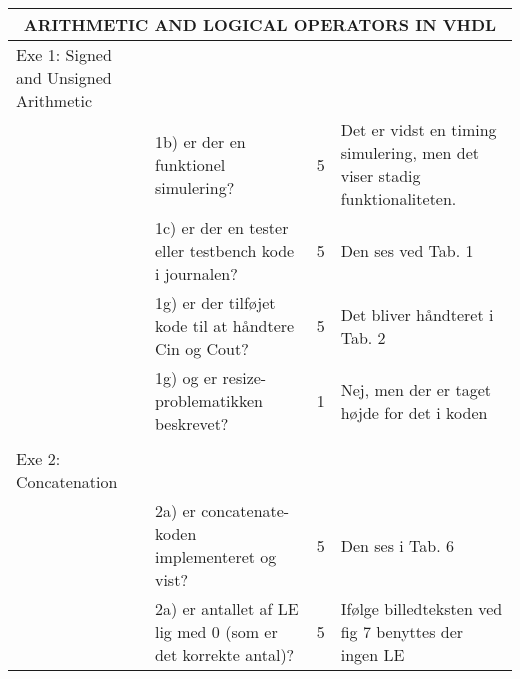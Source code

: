 \begin{table}[h]
    \small
    \begin{tabularx}{\textwidth}{p{3.5cm}Xp{5mm}X}

        \toprule
        \multicolumn{4}{c}{ARITHMETIC AND LOGICAL OPERATORS IN VHDL}                                                                                                                                                \\\midrule
        Exe 1: Signed and Unsigned Arithmetic &                                                                                                     &   &                                                           \\
                                              & 1b) er der en funktionel simulering?                                                                & 5 & Det er vidst en timing simulering, men det viser stadig funktionaliteten.              \\
                                              & 1c) er der en tester eller testbench kode i journalen?                                              & 5 & Den ses ved Tab. 1                              \\
                                              & 1g) er der tilføjet kode til at håndtere Cin og Cout?                                               & 5 & Det bliver håndteret i Tab. 2               \\
                                              & 1g) og er resize-problematikken beskrevet?                                                          & 1 & Nej, men der er taget højde for det i koden                               \\
                                              &                                                                                                     &   &                                                           \\ \midrule
        Exe 2: Concatenation                  &                                                                                                     &   &                                                           \\
                                              & 2a) er concatenate-koden implementeret og vist?                                                     & 5 & Den ses i Tab. 6                                     \\
                                              & 2a) er antallet af LE lig med 0 (som er det korrekte antal)?                                        & 5 & Ifølge billedteksten ved fig 7 benyttes der ingen LE                       \\

\end{tabularx}
\end{table}
